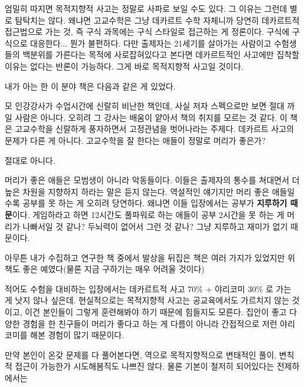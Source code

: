 엄밀히 따지면 목적지향적 사고는 정말로 사파로 보일 수도 있다. 그 이유는 그런데 별로 탐탁치는 않다.
왜냐면 고교수학은 그냥 데카르트 수학 자체니까 당연히 데카르트적 접근법으로 가는 것,
즉 구식 과목에는 구식 스타일로 접근하는 게 정론이다. 구식에 구식으로 대응한다... 뭔가 불편하다.
다만 출제자는 21세기를 살아가는 사람이고 수험생들의 백분위를 가른다는 목적에 사로잡혀있다고 본다면
데카르트적인 사고에만 집착할 이유는 없다는 반론이 가능하다. 그게 바로 목적지향적 사고일 것이다.
\vspace{5mm}

내가 아는 한 이 분야 책은 다음과 같은 게 있었다.
\vspace{5mm}

모 인강강사가 수업시간에 신랄히 비난한 책인데, 사실 저자 스펙으로만 보면 절대 까일 사람은 아니다.
오히려 그 강사는 배움이 얕아서 책의 취지를 모르는 것 같다. 이 책은 고교수학을 신랄하게 풍자하면서 고정관념을 벗어나라는 주제다.
데카르트 사고의 문제가 다른 게 아니다. 고교수학을 잘 한다는 애들이 정말로 머리가 좋은가?
\vspace{5mm}

절대로 아니다.
\vspace{5mm}

머리가 좋은 애들은 모범생이 아니라 악동들이다. 이들은 출제자의 통수를 쳐대면서 더 높은 차원을 지향하지 하라는 말은 듣지 않는다.
역설적인 얘기지만 머리 좋은 애들일수록 공부를 못 하는 게 오히려 당연하다. 왜냐면 이들 입장에서는 공부가 \textbf{지루하기 때문}이다.
게임하라고 하면 12시간도 풀파워로 하는 애들이 공부 2시간을 못 하는 게 머리가 나빠서일 것 같나? 두뇌력이 없어서 그런 것 같나?
그냥 지루하고 재미가 없기 때문이다.
\vspace{5mm}

아무튼 내가 수집하고 연구한 책 중에서 발상을 뒤집은 책은 여러 가지가 있었지만 위 책도 좋은 예였다(물론 지금 구하기는 매우 어려울 것이다)
\vspace{5mm}

적어도 수험을 대비하는 입장에서는 데카르트적 사고 70$\%$ + 야리코미 30$\%$ 로 가는 게 낫지 않나 싶은데.
현실적으로는 목적지향적 사고는 공교육에서도 가르치지 않는 것이고, 이건 본인들이 그렇게 훈련해봐야 하기 때문에 힘들지도 모른다.
집안이 좋고 다양한 경험을 한 친구들이 머리가 좋다고 하는 게 다름이 아니라 간접적으로 저런 야리코미를 해본 경험이 많기 때문이다.
\vspace{5mm}

만약 본인이 온갖 문제를 다 풀어본다면, 역으로 목적지향적으로 변태적인 풀이, 변칙적 접근이 가능한가 시도해봄직도 나쁘진 않다.
물론 기본이 철저히 되어있다는 전제하에서는
\vspace{5mm}













